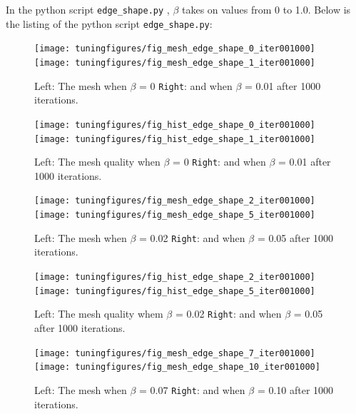 \documentclass[10pt,a4paper]{book}
\newcommand{\py}[1]{\texttt{\color{blue}#1}}
\begin{document}
In the python script \py{edge\_shape.py} , $\beta$ takes on values from 0 to 1.0. Below is the listing of the python script \py{edge\_shape.py}:




\begin{figure}[tbhp]
\centerline{\texttt{[image: tuningfigures/fig\_mesh\_edge\_shape\_0\_iter001000]}\hspace{3cm}\texttt{[image: tuningfigures/fig\_mesh\_edge\_shape\_1\_iter001000]}}
\caption{\label{fig:fig_mesh_edge_shape_0_iter001000} Left: The mesh when $\beta$ = 0 \texttt{Right}: and when $\beta$ = 0.01 after 1000 iterations.}
\end{figure}

\begin{figure}[tbhp]
\centerline{\texttt{[image: tuningfigures/fig\_hist\_edge\_shape\_0\_iter001000]}\hspace{3cm}\texttt{[image: tuningfigures/fig\_hist\_edge\_shape\_1\_iter001000]}}
\caption{\label{fig:fig_hist_edge_shape_0_iter001000} Left: The mesh quality when $\beta$ = 0 \texttt{Right}: and when $\beta$ = 0.01 after 1000 iterations.}
\end{figure}

\begin{figure}[tbhp]
\centerline{\texttt{[image: tuningfigures/fig\_mesh\_edge\_shape\_2\_iter001000]}\hspace{3cm}\texttt{[image: tuningfigures/fig\_mesh\_edge\_shape\_5\_iter001000]}}
\caption{\label{fig:fig_mesh_edge_shape_2_iter001000} Left: The mesh when $\beta$ = 0.02 \texttt{Right}: and when $\beta$ = 0.05 after 1000 iterations.}
\end{figure}

\begin{figure}[tbhp]
\centerline{\texttt{[image: tuningfigures/fig\_hist\_edge\_shape\_2\_iter001000]}\hspace{3cm}\texttt{[image: tuningfigures/fig\_hist\_edge\_shape\_5\_iter001000]}}
\caption{\label{fig:fig_hist_edge_shape_2_iter001000} Left: The mesh quality whem $\beta$ = 0.02 \texttt{Right}: and when $\beta$ = 0.05 after 1000 iterations.}
\end{figure}

\begin{figure}[tbhp]
\centerline{\texttt{[image: tuningfigures/fig\_mesh\_edge\_shape\_7\_iter001000]}\hspace{3cm}\texttt{[image: tuningfigures/fig\_mesh\_edge\_shape\_10\_iter001000]}}
\caption{\label{fig:fig_mesh_edge_shape_7_iter001000} Left: The mesh when $\beta$ = 0.07 \texttt{Right}: and when $\beta$ = 0.10 after 1000 iterations.}
\end{figure}
\end{document}
